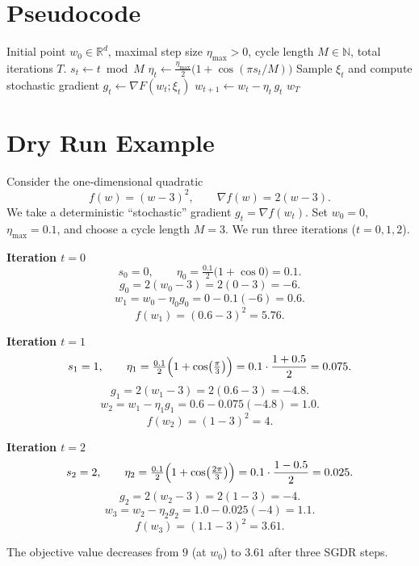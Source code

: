\documentclass{article}
\newcommand{\R}{\mathbb{R}}
\begin{document}
\section*{Pseudocode}
\begin{algorithm}[H]
\caption{SGDR}
\begin{algorithmic}[1]
\REQUIRE Initial point $w_0\in\R^d$, maximal step size $\eta_{\max}>0$, cycle length $M\in\mathbb{N}$, total iterations $T$.
    \STATE $s_t \gets t \bmod M$
    \STATE $\displaystyle \eta_t \gets \frac{\eta_{\max}}{2}\bigl(1+\cos(\pi s_t / M)\bigr)$ 
    \STATE Sample $\xi_t$ and compute stochastic gradient $g_t \gets \nabla F(w_t;\xi_t)$
    \STATE $w_{t+1} \gets w_t - \eta_t\, g_t$ 
\ENDFOR
\RETURN $w_T$
\end{algorithmic}
\end{algorithm}

\section*{Dry Run Example}
Consider the one‑dimensional quadratic
\[
f(w)=(w-3)^2,\qquad \nabla f(w)=2(w-3).
\]
We take a deterministic “stochastic” gradient $g_t=\nabla f(w_t)$.  
Set $w_0=0$, $\eta_{\max}=0.1$, and choose a cycle length $M=3$.  
We run three iterations ($t=0,1,2$).

\bigskip
\noindent\textbf{Iteration $t=0$}
\[
s_0=0,\qquad 
\eta_0=\tfrac{0.1}{2}\bigl(1+\cos 0\bigr)=0.1.
\]
\[
g_0 = 2(w_0-3)=2(0-3)=-6.
\]
\[
w_1 = w_0-\eta_0 g_0 = 0-0.1(-6)=0.6.
\]
\[
f(w_1)=(0.6-3)^2=5.76.
\]

\bigskip
\noindent\textbf{Iteration $t=1$}
\[
s_1=1,\qquad 
\eta_1=\tfrac{0.1}{2}\Bigl(1+\cos\bigl(\tfrac{\pi}{3}\bigr)\Bigr)
      =0.1\cdot\frac{1+0.5}{2}=0.075.
\]
\[
g_1 = 2(w_1-3)=2(0.6-3)=-4.8.
\]
\[
w_2 = w_1-\eta_1 g_1 = 0.6-0.075(-4.8)=1.0.
\]
\[
f(w_2)=(1-3)^2=4.
\]

\bigskip
\noindent\textbf{Iteration $t=2$}
\[
s_2=2,\qquad 
\eta_2=\tfrac{0.1}{2}\Bigl(1+\cos\bigl(\tfrac{2\pi}{3}\bigr)\Bigr)
      =0.1\cdot\frac{1-0.5}{2}=0.025.
\]
\[
g_2 = 2(w_2-3)=2(1-3)=-4.
\]
\[
w_3 = w_2-\eta_2 g_2 = 1.0-0.025(-4)=1.1.
\]
\[
f(w_3)=(1.1-3)^2=3.61.
\]

The objective value decreases from $9$ (at $w_0$) to $3.61$ after three SGDR steps.
\end{document}
